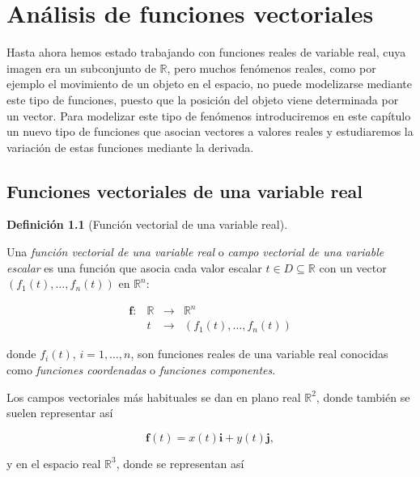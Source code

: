\documentclass[
  a4paper,
]{scrreport}
\theoremstyle{definition}
\theoremstyle{plain}
\theoremstyle{definition}
\newtheorem{definition}{Definición}[chapter]
\theoremstyle{definition}
\theoremstyle{plain}
\theoremstyle{plain}
\theoremstyle{remark}
\begin{document}

\chapter{Análisis de funciones
vectoriales}\label{anuxe1lisis-de-funciones-vectoriales}

Hasta ahora hemos estado trabajando con funciones reales de variable
real, cuya imagen era un subconjunto de \(\mathbb{R}\), pero muchos
fenómenos reales, como por ejemplo el movimiento de un objeto en el
espacio, no puede modelizarse mediante este tipo de funciones, puesto
que la posición del objeto viene determinada por un vector. Para
modelizar este tipo de fenómenos introduciremos en este capítulo un
nuevo tipo de funciones que asocian vectores a valores reales y
estudiaremos la variación de estas funciones mediante la derivada.

\section{Funciones vectoriales de una variable
real}\label{funciones-vectoriales-de-una-variable-real}

\begin{definition}[Función vectorial de una variable
real]\protect\hypertarget{def-funcion-vectorial}{}\label{def-funcion-vectorial}

Una \emph{función vectorial de una variable real} o \emph{campo
vectorial de una variable escalar} es una función que asocia cada valor
escalar \(t\in D\subseteq \mathbb{R}\) con un vector
\((f_1(t),\ldots,f_n(t))\) en \(\mathbb{R}^n\):

\[
\begin{array}{rccl}
\mathbf{f}: & \mathbb{R} & \longrightarrow & \mathbb{R}^n \\
& t & \longrightarrow & (f_1(t),\ldots, f_n(t))
\end{array}
\]

donde \(f_i(t)\), \(i=1,\ldots,n\), son funciones reales de una variable
real conocidas como \emph{funciones coordenadas} o \emph{funciones
componentes}.

\end{definition}

Los campos vectoriales más habituales se dan en plano real
\(\mathbb{R}^2\), donde también se suelen representar así

\[
\mathbf{f}(t) = x(t)\mathbf{i}+y(t)\mathbf{j},
\]

y en el espacio real \(\mathbb{R}^3\), donde se representan así
\end{document}
